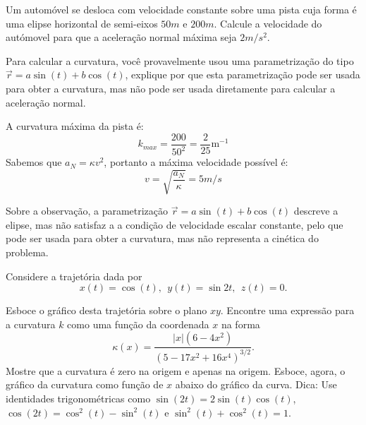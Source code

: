 \begin{exeresol}
Um automóvel se desloca com velocidade constante sobre uma pista cuja forma é uma elipse horizontal de semi-eixos $50m$ e $200m$. Calcule a velocidade do autómovel para que a aceleração normal máxima seja $2m/s^2$. 


 Para calcular a curvatura, você provavelmente usou uma parametrização do tipo $\vec{r}=a\sin (t) + b\cos (t)$, explique por que esta parametrização pode ser usada para obter a curvatura, mas não pode ser usada diretamente para calcular a aceleração normal.
\end{exeresol}
\begin{resol}
A curvatura máxima da pista é:
 $$k_{max}=\frac{200}{50^2}=\frac{2}{25}\text{m}^{-1}$$
 Sabemos que $a_N=\kappa v^2$, portanto a máxima velocidade possível é:
 $$v=\sqrt{\frac{a_N}{\kappa}}=5m/s$$

 Sobre a observação, a parametrização $\vec{r}=a\sin (t) + b\cos (t)$ descreve a elipse, mas não satisfaz a a condição de velocidade escalar constante, pelo que pode ser usada para obter a curvatura, mas não representa a cinética do problema.
\end{resol}
\begin{exer}
Considere a trajetória  dada por
$$x(t)=\cos(t),~~  y(t)=\sin 2t,~~ z(t)=0.$$

Esboce o gráfico desta trajetória sobre o plano $xy$. Encontre uma expressão para a curvatura $k$ como uma função da coordenada $x$ na forma $$\kappa(x)=\frac{|x|(6-4x^2)}{\left(5-17x^2+16x^4\right)^{3/2}}.$$ Mostre que a curvatura é zero na origem e apenas na origem. Esboce, agora, o gráfico da curvatura como função de $x$ abaixo do gráfico da curva.
Dica: Use identidades trigonométricas como $\sin(2t)=2\sin(t)\cos(t)$, $\cos(2t)=\cos^2(t)-\sin^2(t)$ e $\sin^2(t)+\cos^2(t)=1$.
\end{exer}
